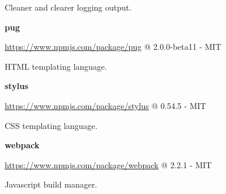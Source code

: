   Cleaner and clearer logging output.

  \textbf{pug}

  \url{https://www.npmjs.com/package/pug} @ 2.0.0-beta11 - MIT

  HTML templating language.

  \textbf{stylus}

  \url{https://www.npmjs.com/package/stylus} @ 0.54.5 - MIT

  CSS templating language.

  \textbf{webpack}

  \url{https://www.npmjs.com/package/webpack} @ 2.2.1 - MIT

  Javascript build manager.






